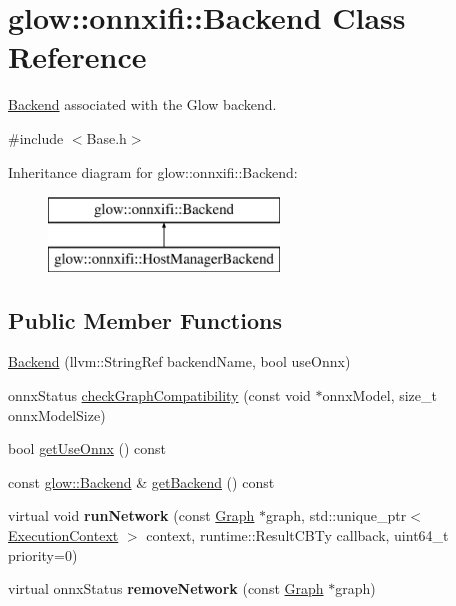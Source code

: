 \hypertarget{classglow_1_1onnxifi_1_1_backend}{}\section{glow\+:\+:onnxifi\+:\+:Backend Class Reference}
\label{classglow_1_1onnxifi_1_1_backend}


\hyperlink{classglow_1_1onnxifi_1_1_backend}{Backend} associated with the Glow backend.  




{\ttfamily \#include $<$Base.\+h$>$}

Inheritance diagram for glow\+:\+:onnxifi\+:\+:Backend\+:\begin{figure}[H]
\begin{center}
\leavevmode
\includegraphics[height=2.000000cm]{classglow_1_1onnxifi_1_1_backend}
\end{center}
\end{figure}
\subsection*{Public Member Functions}
\begin{DoxyCompactItemize}
\item 
\hyperlink{classglow_1_1onnxifi_1_1_backend_a6a036bd2e229fb03eac9e0d95441ba7b}{Backend} (llvm\+::\+String\+Ref backend\+Name, bool use\+Onnx)
\item 
onnx\+Status \hyperlink{classglow_1_1onnxifi_1_1_backend_a79939dc106d9bbe5a32ddfb4ad4ca4d1}{check\+Graph\+Compatibility} (const void $\ast$onnx\+Model, size\+\_\+t onnx\+Model\+Size)
\item 
bool \hyperlink{classglow_1_1onnxifi_1_1_backend_a88246d856e8c190f8881409b9633af70}{get\+Use\+Onnx} () const
\item 
const \hyperlink{classglow_1_1_backend}{glow\+::\+Backend} \& \hyperlink{classglow_1_1onnxifi_1_1_backend_abd60b559f37bb9aacb3c92afd08b5870}{get\+Backend} () const
\item 
\mbox{\label{classglow_1_1onnxifi_1_1_backend_acae5a8cbab08b0d5b94fe387df6d23ba}} 
virtual void {\bfseries run\+Network} (const \hyperlink{classglow_1_1onnxifi_1_1_graph}{Graph} $\ast$graph, std\+::unique\+\_\+ptr$<$ \hyperlink{classglow_1_1_execution_context}{Execution\+Context} $>$ context, runtime\+::\+Result\+C\+B\+Ty callback, uint64\+\_\+t priority=0)
\item 
\mbox{\label{classglow_1_1onnxifi_1_1_backend_a28eee21f62a59a729bf9be54dc5f0e25}} 
virtual onnx\+Status {\bfseries remove\+Network} (const \hyperlink{classglow_1_1onnxifi_1_1_graph}{Graph} $\ast$graph)
\end{DoxyCompactItemize}
